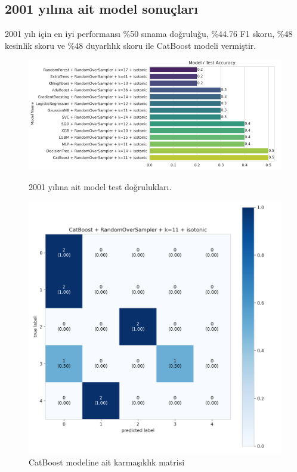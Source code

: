 \newpage

\subsection{2001 yılına ait model sonuçları}
2001 yılı için en iyi performansı \%50 sınama doğruluğu,  \%44.76 F1 skoru, \%48 kesinlik skoru ve \%48 duyarlılık skoru ile CatBoost modeli vermiştir.

\begin{figure}[ht]
\centering
\begin{minipage}[b]{0.6\textwidth}
    \centering
    \includegraphics[width=\textwidth]{2001.png}
    \caption{2001 yılına ait model test doğrulukları.}
    \label{fig:resim1}
\end{minipage}
\hfill
\begin{minipage}[b]{0.6\textwidth}
    \centering
    \includegraphics[width=\textwidth]{2001_cm.png}
    \caption{CatBoost modeline ait karmaşıklık matrisi}
    \label{fig:resim2}
\end{minipage}
\end{figure}

